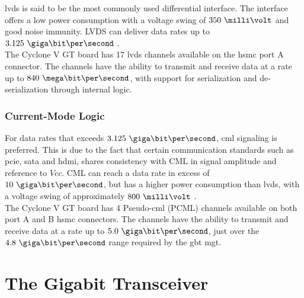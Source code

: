 \documentclass[main.tex]{subfiles}
\begin{document}
\gls{lvds} is said to be the most commonly used differential interface. The interface offers a low power consumption with a voltage swing of $350\ \milli\volt$ and good noise immunity. LVDS can deliver data rates up to $3.125\ \giga\bit\per\second$ \cite{ti08lvds}.\\

The Cyclone V GT board has 17 \gls{lvds} channels available on the \gls{hsmc} port A connector. The channels have the ability to transmit and receive data at a rate up to $840\ \mega\bit\per\second$, with support for serialization and de-serialization through internal logic. \cite{altera_cvoverview15}

\subsection{Current-Mode Logic}

For data rates that exceeds $3.125\ \giga\bit\per\second$, \gls{cml} signaling is preferred. This is due to the fact that certain communication standards such as \acrshort{pcie}, \acrshort{sata} and \acrshort{hdmi}, shares consistency with CML in signal amplitude and reference to $Vcc$. CML can reach a data rate in excess of $10\ \giga\bit\per\second$, but has a higher power consumption than \gls{lvds}, with a voltage swing of approximately $800\ \milli\volt$ \cite{ti08lvds}.\\

The Cyclone V GT board has 4 Pseudo-\gls{cml} (PCML) channels available on both port A and B \gls{hsmc} connectors. The channels have the ability to transmit and receive data at a rate up to $5.0\ \giga\bit\per\second$, just over the $4.8\ \giga\bit\per\second$ range required by the \gls{gbt} \gls{mgt}. \cite{altera_cyclonekit}






\chapter{The Gigabit Transceiver} \label{chap:gbt}
\end{document}
